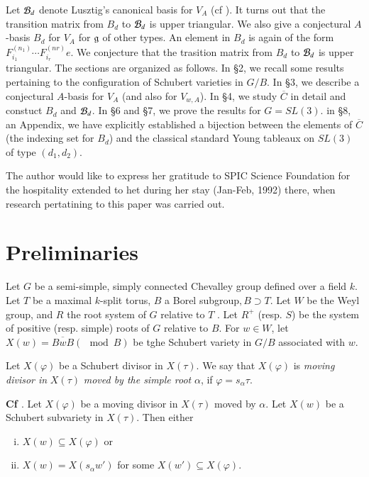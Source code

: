 Let $\mathcal{B}_{d}$ denote Lusztig's canonical basis for $V_{A}$ (cf \cite{art9-keyL2}). It turns out that the transition matrix from $B_{d}$ to $\mathcal{B}_{d}$ is upper triangular. We also give a conjectural $A$-basis $B_{d}$ for $V_{A}$ for $\mathfrak{g}$ of other types. An element in $B_{d}$ is again of the form $F_{i_{1}}^{(n_{1})}\cdots F_{i_{r}}^{(nr)}e$. We conjecture that the trasition matrix from $B_{d}$ to $\mathcal{B}_{d}$ is upper triangular. The sections are organized as follows. In \S2,
we recall some results pertaining to the configuration of Schubert varieties in $G/B$. In \S3, we describe a conjectural $A$-basis  for $V_{A}$ (and also for $V_{w, A}$). In \S4, we study $\overline{C}$ in detail and constuct $B_{d}$ and $\mathcal{B}_{d}$. In \S6 and \S7, we prove the results for $G=SL(3)$. in \S8, an Appendix, we have explicitly established a bijection between the elements of $\overline{C}$ (the indexing set for $B_{d}$) and the classical standard Young tableaux on $SL(3)$ of type $(d_{1}, d_{2})$.

The author would like to express her gratitude to SPIC Science Foundation for the hospitality extended to het during her stay (Jan-Feb, 1992) there, when research pertatining to this paper was carried out.

\section{Preliminaries}\label{art9-sec-2}

Let $G$ be a semi-simple, simply connected Chevalley group defined over a field $k$. Let $T$ be a maximal $k$-split torus, $B$ a Borel subgroup$, B\supset T$. Let $W$ be the Weyl group, and $R$ the root system of $G$ relative to $T$ . Let $R^{+}$ (resp. $S$) be the system of positive (resp. simple) roots of $G$ relative to $B$. For $w \in W$, let $X(w) = \overline{BwB}(\mod B)$ be tghe Schubert variety in $G/B$ associated with $w$.

\begin{definition}\label{art9-definition-2.1}
Let $X(\varphi)$ be a Schubert divisor in $X(\tau)$. We say that $X(\varphi)$ is \textit{moving divisor in} $X(\tau)$ \textit{moved by the simple root} $\alpha$, if $\varphi=s_{\alpha} \tau$.
\end{definition}

\begin{lemma}\label{art9-lemma-2.2}
{\bf Cf \cite{art9-keyL-S}}. Let $X(\varphi)$ be a moving divisor in $X(\tau)$ moved by $\alpha$. Let $X(w)$ be a Schubert subvariety in $X(\tau)$. Then either
\begin{enumerate}[(i)]
\item $X(w) \subseteq X(\varphi)$ or\label{art9-lemma2.2-enum-1}
\item $X(w) = X(s_{\alpha}w')$ for some $X(w') \subseteq X(\varphi)$.\label{art9-lemma2.2-enum-2}
\end{enumerate}
\end{lemma}

